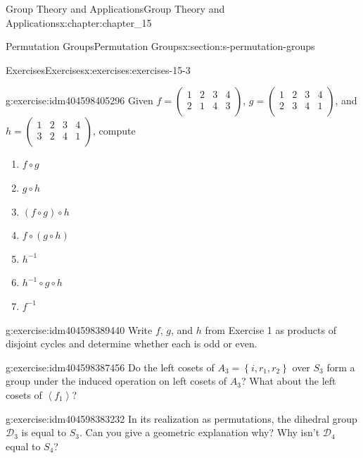 \documentclass[twoside,10pt,]{book}
\numberwithin{equation}{section}
\begin{document}
\begin{chapterptx}{Group Theory and Applications}{}{Group Theory and Applications}{}{}{x:chapter:chapter_15}
\begin{sectionptx}{Permutation Groups}{}{Permutation Groups}{}{}{x:section:s-permutation-groups}
%
\begin{exercises-subsection}{Exercises}{}{Exercises}{}{}{x:exercises:exercises-15-3}
\begin{divisionexercise}{1}{}{}{g:exercise:idm404598405296}%
Given \(f=\left(
\begin{array}{cccc}
1 & 2 & 3 & 4 \\
2 & 1 & 4 & 3 \\
\end{array}
\right)\), \(g=\left(
\begin{array}{cccc}
1 & 2 & 3 & 4 \\
2 & 3 & 4 & 1 \\
\end{array}
\right)\), and \(h=\left(
\begin{array}{cccc}
1 & 2 & 3 & 4 \\
3 & 2 & 4 & 1 \\
\end{array}
\right)\), compute%
\begin{multicols}{2}
\begin{enumerate}[label=(\alph*)]
\item{}\(f\circ g\)%
\item{}\(g\circ h\)%
\item{}\((f\circ g)\circ h\)%
\item{}\(f\circ (g\circ h)\)%
\item{}\(h^{-1}\)%
\item{}\(h^{-1} \circ g\circ h\)%
\item{}\(f^{-1}\)%
\end{enumerate}
\end{multicols}
%
\end{divisionexercise}%
\begin{divisionexercise}{2}{}{}{g:exercise:idm404598389440}%
Write \(f\), \(g\), and \(h\) from Exercise 1 as products of disjoint cycles and determine whether each is odd or even.%
\end{divisionexercise}%
\begin{divisionexercise}{3}{}{}{g:exercise:idm404598387456}%
Do the left cosets of \(A_3=\left\{i,r_1,r_2\right\}\) over \(S_3\) form a group under the induced operation on left cosets of \(A_3\)? What about the left cosets of \(\left\langle f_1\right\rangle\)?%
\end{divisionexercise}%
\begin{divisionexercise}{4}{}{}{g:exercise:idm404598383232}%
In its realization as permutations, the dihedral group \(\mathcal{D}_3\) is equal to \(S_3\). Can you give a geometric explanation why?   Why isn't \(\mathcal{D}_4\) equal to \(S_4\)?%

\end{divisionexercise}
\end{exercises-subsection}
\end{sectionptx}
\end{chapterptx}
\end{document}
